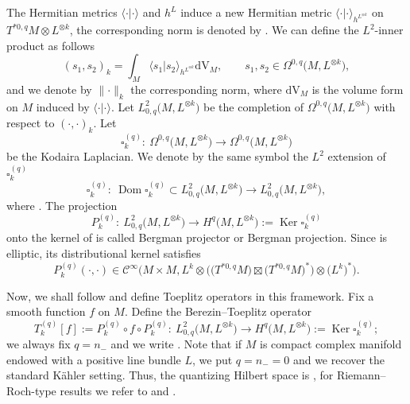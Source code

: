 \documentclass[pdftex]{sigma}
\numberwithin{equation}{section}
\newcommand{\To}{\rightarrow}
\begin{document}
	 The Hermitian metrics $\langle \cdot | \cdot \rangle$ and $h^L$ induce a new Hermitian metric $\langle \cdot | \cdot \rangle_{h^{L^{\otimes k}}}$ on $T^{*0,q}M\otimes L^{\otimes k}$, the corresponding norm is denoted by . We can define the $L^2$-inner product as follows
	 \[(s_1,s_2)_k=\int_M \langle s_1 | s_2 \rangle_{h^{L^{\otimes k}}} \mathrm{dV}_M,\qquad s_1, s_2\in \Omega^{0,q}\bigl(M,L^{\otimes k}\bigr) , \]
	 and we denote by $\lVert \cdot \rVert_{k}$ the corresponding norm, where $\mathrm{dV}_M$ is the volume form on $M$ induced by $\langle \cdot | \cdot \rangle$.
	 Let $L^2_{0,q}\bigl(M,L^{\otimes k}\bigr)$ be the completion of $\Omega^{0,q}\bigl(M,L^{\otimes k}\bigr)$ with respect to $(\cdot ,\cdot)_k$. Let
 \[
 \square^{(q)}_k\colon\ \Omega^{0,q}\bigl(M,L^{\otimes k}\bigr)\To\Omega^{0,q}\bigl(M,L^{\otimes k}\bigr)
 \]
 be the Kodaira Laplacian. We denote by the same symbol the $L^2$ extension of $\square^{(q)}_k$
	 \[\square^{(q)}_k\colon\ \operatorname{Dom}\square^{(q)}_k\subset L^2_{0,q}\bigl(M,L^{\otimes k}\bigr)\To L^2_{0,q}\bigl(M,L^{\otimes k}\bigr),\]
	 where
.
	 The projection
	 \[ P^{(q)}_k \colon\ L^2_{0,q}\bigl(M,L^{\otimes k}\bigr) \rightarrow H^q\bigl(M,L^{\otimes k}\bigr):=\operatorname{Ker}\square^{(q)}_k
\]
	 onto the kernel of  is called Bergman projector or Bergman projection. Since  is elliptic, its distributional kernel satisfies
	 \[P^{(q)}_k( \cdot , \cdot )\in\mathcal{C}^{\infty}\bigl(M\times M, L^k\otimes \bigl(\bigl(T^{*0,q}M\bigr)\boxtimes \bigl(T^{*0,q}M\bigr)^*\bigr)\otimes \bigl(L^k\bigr)^*\bigr) . \]

Now, we shall follow \cite{hsma1} and define Toeplitz operators in this framework. Fix a smooth function $f$ on $M$. Define the Berezin--Toeplitz operator
	 \[T^{(q)}_{k}[f]:= P^{(q)}_k\circ f \circ P^{(q)}_k \colon\ L^2_{0,q}\bigl(M,L^{\otimes k}\bigr) \rightarrow H^q\bigl(M,L^{\otimes k}\bigr):=\operatorname{Ker}\square^{(q)}_k ; \]
	 we always fix $q=n_-$ and we write . Note that if $M$ is compact complex manifold endowed with a positive line bundle $L$, we put $q=n_-=0$ and we recover the standard K\"ahler setting. Thus, the quantizing Hilbert space is , for Riemann--Roch-type results we refer to \cite{hsma1} and \cite[Section~1.2]{gh2}.
\end{document}
